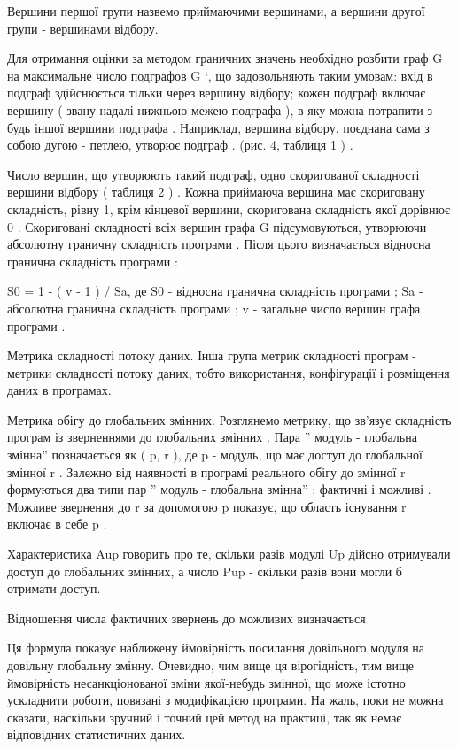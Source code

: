 Вершини першої групи назвемо приймаючими вершинами, а вершини другої групи - вершинами відбору.

Для отримання оцінки за методом граничних значень необхідно розбити граф G на максимальне число подграфов G `, що задовольняють таким умовам: вхід в подграф здійснюється тільки через вершину відбору; кожен подграф включає вершину ( звану надалі нижньою межею подграфа ), в яку можна потрапити з будь іншої вершини подграфа . Наприклад, вершина відбору, поєднана сама з собою дугою - петлею, утворює подграф . (рис. 4, таблиця 1 ) .

Число вершин, що утворюють такий подграф, одно скоригованої складності вершини відбору ( таблиця 2 ) . Кожна приймаюча вершина має скориговану складність, рівну 1, крім кінцевої вершини, скоригована складність якої дорівнює 0 . Скориговані складності всіх вершин графа G підсумовуються, утворюючи абсолютну граничну складність програми . Після цього визначається відносна гранична складність програми :

S0 = 1 - ( v - 1 ) / Sa,
де S0 - відносна гранична складність програми ; Sa - абсолютна гранична складність програми ; v - загальне число вершин графа програми .

Метрика складності потоку даних.
Інша група метрик складності програм - метрики складності потоку даних, тобто використання, конфігурації і розміщення даних в програмах.

Метрика обігу до глобальних змінних.
Розглянемо метрику, що зв'язує складність програм із зверненнями до глобальних змінних .
Пара '' модуль - глобальна змінна'' позначається як ( p, r ), де p - модуль, що має доступ до глобальної змінної r . Залежно від наявності в програмі реального обігу до змінної r формуються два типи пар '' модуль - глобальна змінна'' : фактичні і можливі . Можливе звернення до r за допомогою p показує, що область існування r включає в себе p .

Характеристика Aup говорить про те, скільки разів модулі Up дійсно отримували доступ до глобальних змінних, а число Pup - скільки разів вони могли б отримати доступ.

Відношення числа фактичних звернень до можливих визначається


Ця формула показує наближену ймовірність посилання довільного модуля на довільну глобальну змінну. Очевидно, чим вище ця вірогідність, тим вище ймовірність несанкціонованої зміни якої-небудь змінної, що може істотно ускладнити роботи, пов\dq язані з модифікацією програми. На жаль, поки не можна сказати, наскільки зручний і точний цей метод на практиці, так як немає відповідних статистичних даних.

